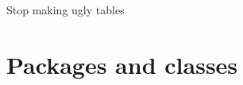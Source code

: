 \documentclass[xetex, onlymath, handout]{beamer}
\begin{document}
\begin{frame}[fragile]{Stop making ugly tables}


\end{frame}

\section{Packages and classes}
\end{document}
